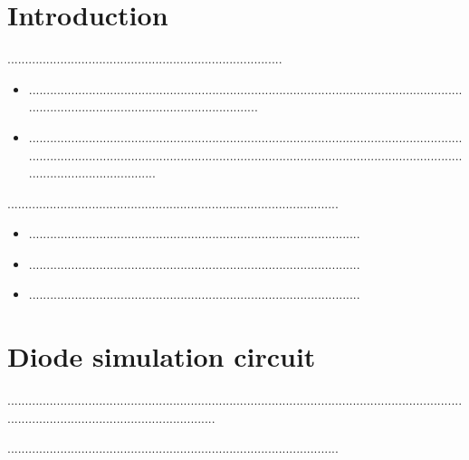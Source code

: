 \section{Introduction}
..............................................................................
\begin{itemize}
	\item ............................................................................................................................................................................................
	\item ..........................................................................................................................................................................................................................................................................................
\end{itemize}
..............................................................................................
\begin{itemize}
    \item ..............................................................................................
    \item ..............................................................................................
    \item ..............................................................................................
\end{itemize}
\newpage
\section{Diode simulation circuit}
............................................................................................................................................................................................


..............................................................................................
